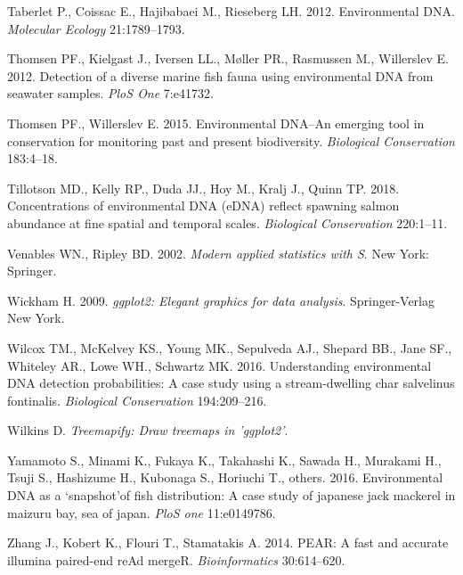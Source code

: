 \documentclass[fleqn,10pt,lineno]{wlpeerj} %
\begin{document}
\hypertarget{ref-taberlet2012environmental}{}
Taberlet P., Coissac E., Hajibabaei M., Rieseberg LH. 2012.
Environmental DNA. \emph{Molecular Ecology} 21:1789--1793.

\hypertarget{ref-thomsen_detection_2012}{}
Thomsen PF., Kielgast J., Iversen LL., Møller PR., Rasmussen M.,
Willerslev E. 2012. Detection of a diverse marine fish fauna using
environmental DNA from seawater samples. \emph{PloS One} 7:e41732.

\hypertarget{ref-thomsen2015environmental}{}
Thomsen PF., Willerslev E. 2015. Environmental DNA--An emerging tool in
conservation for monitoring past and present biodiversity.
\emph{Biological Conservation} 183:4--18.

\hypertarget{ref-tillotson2018concentrations}{}
Tillotson MD., Kelly RP., Duda JJ., Hoy M., Kralj J., Quinn TP. 2018. Concentrations of environmental DNA (eDNA) reflect spawning salmon abundance at fine spatial and temporal scales.
\emph{Biological Conservation} 220:1--11.

\hypertarget{ref-MASS}{}
Venables WN., Ripley BD. 2002. \emph{Modern applied statistics with S}.
New York: Springer.

\hypertarget{ref-ggplot}{}
Wickham H. 2009. \emph{ggplot2: Elegant graphics for data analysis}.
Springer-Verlag New York.

\hypertarget{ref-wilcox2016understanding}{}
Wilcox TM., McKelvey KS., Young MK., Sepulveda AJ., Shepard BB., Jane
SF., Whiteley AR., Lowe WH., Schwartz MK. 2016. Understanding
environmental DNA detection probabilities: A case study using a
stream-dwelling char salvelinus fontinalis. \emph{Biological
Conservation} 194:209--216.

\hypertarget{ref-treemapify}{}
Wilkins D. \emph{Treemapify: Draw treemaps in 'ggplot2'}.

\hypertarget{ref-yamamoto2016environmental}{}
Yamamoto S., Minami K., Fukaya K., Takahashi K., Sawada H., Murakami H.,
Tsuji S., Hashizume H., Kubonaga S., Horiuchi T., others. 2016.
Environmental DNA as a `snapshot'of fish distribution: A case study of
japanese jack mackerel in maizuru bay, sea of japan. \emph{PloS one}
11:e0149786.

\hypertarget{ref-zhang2014pear}{}
Zhang J., Kobert K., Flouri T., Stamatakis A. 2014. PEAR: A fast and
accurate illumina paired-end reAd mergeR. \emph{Bioinformatics}
30:614--620.
\end{document}
